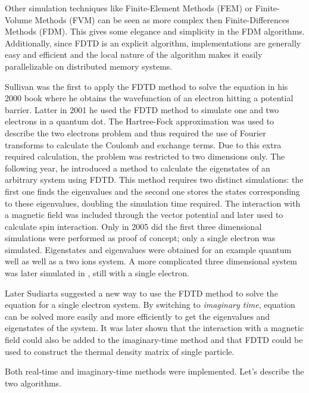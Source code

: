 Other simulation techniques like Finite-Element Methods (FEM) or Finite-Volume
Methods (FVM) can be seen as more complex then Finite-Differences Methods
(FDM). This gives some elegance and simplicity in the FDM algorithms.
Additionally, since FDTD is an explicit algorithm, implementations are
generally easy and efficient and the local nature of the algorithm makes it
easily parallelizable on distributed memory systems.

Sullivan was the first to apply the FDTD method to solve the \schrodinger
equation in his 2000 book\cite{Sullivan2000} where he obtains the wavefunction
of an electron hitting a potential barrier. Latter in 2001 he used the FDTD
method to simulate one and two electrons in a quantum dot\cite{Sullivan2001}.
The Hartree-Fock approximation was used to describe the two electrons problem
and thus required the use of Fourier transforms to calculate the Coulomb
and exchange terms. Due to this extra required calculation, the problem was
restricted to two dimensions only. The following year, he introduced a method
to calculate the eigenstates of an arbitrary system using
FDTD\cite{Sullivan2002}. This method requires two distinct simulations: the
first one finds the eigenvalues and the second one stores the states
corresponding to these eigenvalues, doubling the simulation time required.
The interaction with a magnetic field was included through the vector potential
and later\cite{Sullivan2003,Sullivan2004} used to calculate spin interaction.
Only in 2005 did the first three dimensional
simulations\cite{Sullivan2005a} were performed as proof of concept; only a
single electron was simulated. Eigenstates and eigenvalues were obtained for an
example quantum well as well as a two ions system. A more complicated three
dimensional system was later simulated in \cite{Sullivan2005b}, still with a
single electron.

Later Sudiarta suggested\cite{Sudiarta2007} a new way to use the FDTD method to
solve the \schrodinger equation for a single electron system. By switching to
\textit{imaginary time}, \schrodinger equation can be solved more easily and
more efficiently to get the eigenvalues and eigenstates of the system. It was
later shown that the interaction with a magnetic field could also be added to
the imaginary-time method\cite{Sudiarta2008} and that FDTD could be used to
construct the thermal density matrix of single particle\cite{Sudiarta2009}.

Both real-time and imaginary-time methods were implemented. Let's describe the
two algorithms.


